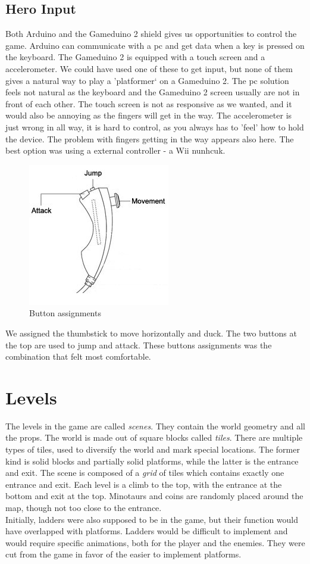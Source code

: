 \subsection{Hero Input}
Both Arduino and the Gameduino 2 shield gives us opportunities to control the game. Arduino can communicate with a pc and get data when a key is pressed on the keyboard. The Gameduino 2 is equipped with a touch screen and a accelerometer. We could have used one of these to get input, but none of them gives a natural way to play a 'platformer` on a Gameduino 2. The pc solution feels not natural as the keyboard and the Gameduino 2 screen usually are not in front of each other. The touch screen is not as responsive as we wanted, and it would also be annoying as the fingers will get in the way. The accelerometer is just wrong in all way, it is hard to control, as you always has to 'feel' how to hold the device. The problem with fingers getting in the way appears also here. The best option was using a external controller - a Wii nunhcuk.

\begin{figure}[h] 
  \centering 
  \includegraphics[scale=0.6]{Figures/nunchuk}
  \caption{Button assignments}
  \label{fig:Nunchuk} 
\end{figure}

We assigned the thumbstick to move horizontally and duck. The two buttons at the top are used to jump and attack. These buttons assignments was the combination that felt most comfortable.

\section{Levels} %
The levels in the game are called \emph{scenes}. They contain the world geometry and all the props. The world is made out of square blocks called \emph{tiles}. There are multiple types of tiles, used to diversify the world and mark special locations. The former kind is solid blocks and partially solid platforms, while the latter is the entrance and exit. The scene is composed of a \emph{grid} of tiles which contains exactly one entrance and exit. Each level is a climb to the top, with the entrance at the bottom and exit at the top. Minotaurs and coins are randomly placed around the map, though not too close to the entrance.\\
Initially, ladders were also supposed to be in the game, but their function would have overlapped with platforms. Ladders would be difficult to implement and would require specific animations, both for the player and the enemies. They were cut from the game in favor of the easier to implement platforms.

